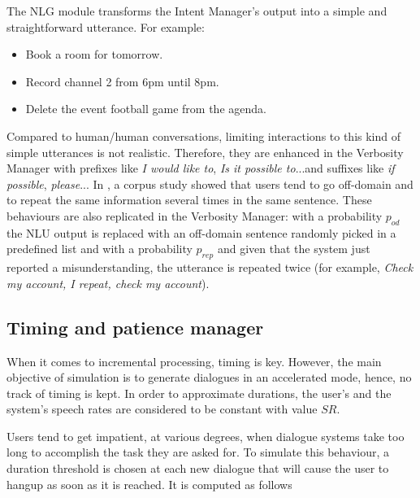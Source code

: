 			The NLG module transforms the Intent Manager's output into a simple and straightforward utterance. For example:
			
			\begin{itemize}
				\item Book a room for tomorrow.
				\item Record channel 2 from 6pm until 8pm.
				\item Delete the event football game from the agenda.
			\end{itemize}
			
			Compared to human/human conversations, limiting interactions to this kind of simple utterances is not realistic. Therefore, they are enhanced in the Verbosity Manager with prefixes like \textit{I would like to}, \textit{Is it possible to}...and suffixes like \textit{if possible}, \textit{please}... In \cite{Ghigi2014}, a corpus study showed that users tend to go off-domain and to repeat the same information several times in the same sentence. These behaviours are also replicated in the Verbosity Manager: with a probability $p_{od}$ the NLU output is replaced with an off-domain sentence randomly picked in a predefined list and with a probability $p_{rep}$ and given that the system just reported a misunderstanding, the utterance is repeated twice (for example, \textit{Check my account, I repeat, check my account}).
			
    
    \subsection{Timing and patience manager}
    
    	When it comes to incremental processing, timing is key. However, the main objective of simulation is to generate dialogues in an accelerated mode, hence, no track of timing is kept. In order to approximate durations, the user's and the system's speech rates are considered to be constant with value $SR$.
			
        
        Users tend to get impatient, at various degrees, when dialogue systems take too long to accomplish the task they are asked for. To simulate this behaviour, a duration threshold is chosen at each new dialogue that will cause the user to hangup as soon as it is reached. It is computed as follows
        
